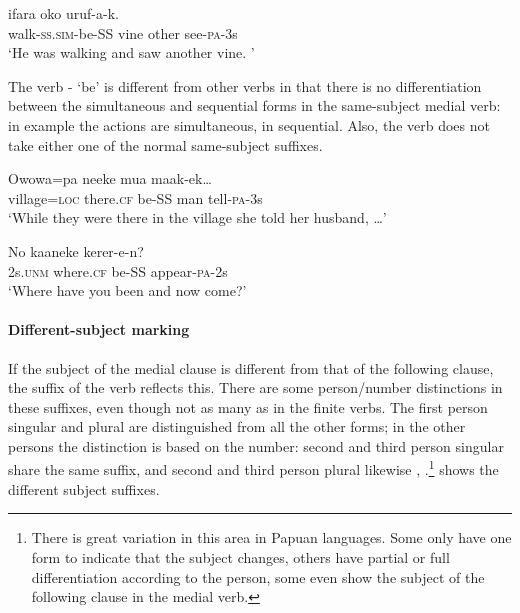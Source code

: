 \ea%
\label{ex:3:x241}
\gll {} ifara oko uruf-a-k. \\
walk-\textsc{ss}.\textsc{sim}-be-SS vine other see-\textsc{pa}-3s \\
\glt`He was walking and saw another vine. '
\z

The verb - `be' is different from other verbs in that there is no differentiation between the simultaneous and sequential forms in the same-subject medial verb: in example  the actions are simultaneous, in  sequential. Also, the verb does not take either one of the normal same-subject suffixes.

\ea%
\label{ex:3:x242}
\gll Owowa=pa neeke  mua maak-ek{\dots} \\
village=\textsc{loc} there.\textsc{cf} be-SS man tell-\textsc{pa}-3s \\
\glt`While they were there in the village she told her husband, {\dots}'
\z

\ea%
\label{ex:3:x243}
\gll No kaaneke  kerer-e-n? \\
2s.\textsc{unm} where.\textsc{cf} be-SS appear-\textsc{pa}-2s \\
\glt`Where have you been and now come?' 
\z

\paragraph{Different-subject marking}\label{sec:3.8.3.5.2}
{}
If the subject of the medial clause is different from that of the following clause, the suffix of the  verb reflects this. There are some person/number distinctions in these suffixes, even though not as many as in the finite verbs. The first person singular and plural are distinguished from all the other forms; in the other persons the distinction is based on the number: second and third person singular share the same suffix, and second and third person plural likewise , .\footnote{There is great variation in this area in Papuan languages. Some only have one form to indicate that the subject changes, others have partial or full differentiation according to the person, some even show the subject of the following clause in the medial verb.}  shows the different subject suffixes.


